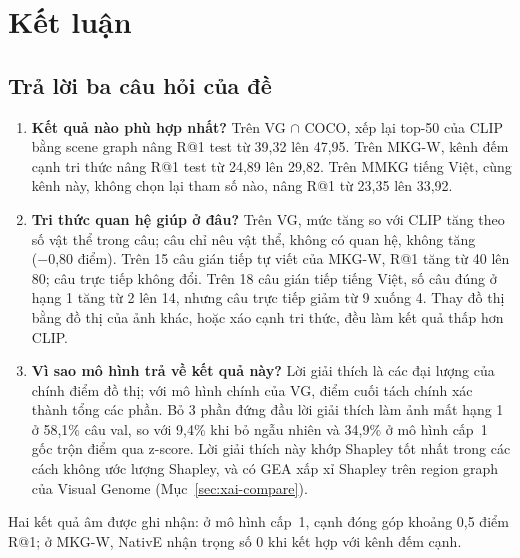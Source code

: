 \section{Kết luận}
\label{sec:conclusion}

\subsection{Trả lời ba câu hỏi của đề}
\begin{enumerate}
\item \textbf{Kết quả nào phù hợp nhất?} Trên VG $\cap$ COCO, xếp lại top-50 của CLIP bằng scene graph nâng R@1 test từ
39,32 lên 47,95. Trên MKG-W, kênh đếm cạnh tri thức nâng R@1 test từ 24,89 lên 29,82. Trên MMKG tiếng Việt, cùng kênh này,
không chọn lại tham số nào, nâng R@1 từ 23,35 lên 33,92.
\item \textbf{Tri thức quan hệ giúp ở đâu?} Trên VG, mức tăng so với CLIP tăng theo số vật thể trong câu; câu chỉ nêu vật thể,
không có quan hệ, không tăng (−0,80 điểm). Trên 15 câu gián tiếp tự viết của MKG-W, R@1 tăng từ 40 lên 80; câu trực tiếp không
đổi. Trên 18 câu gián tiếp tiếng Việt, số câu đúng ở hạng 1 tăng từ 2 lên 14, nhưng câu trực tiếp giảm từ 9 xuống 4. Thay đồ
thị bằng đồ thị của ảnh khác, hoặc xáo cạnh tri thức, đều làm kết quả thấp hơn CLIP.
\item \textbf{Vì sao mô hình trả về kết quả này?} Lời giải thích là các đại lượng của chính điểm đồ thị; với mô hình chính
của VG, điểm cuối tách chính xác thành tổng các phần. Bỏ 3 phần đứng đầu lời giải thích làm ảnh mất hạng 1 ở 58,1\% câu
val, so với 9,4\% khi bỏ ngẫu nhiên và 34,9\% ở mô hình cấp~1 gốc trộn điểm qua z-score. Lời giải thích này khớp Shapley
tốt nhất trong các cách không ước lượng Shapley, và có GEA xấp xỉ Shapley trên region graph của Visual Genome
(Mục~\ref{sec:xai-compare}).
\end{enumerate}
Hai kết quả âm được ghi nhận: ở mô hình cấp~1, cạnh đóng góp khoảng 0,5 điểm R@1; ở MKG-W, NativE nhận trọng số 0 khi kết
hợp với kênh đếm cạnh.

